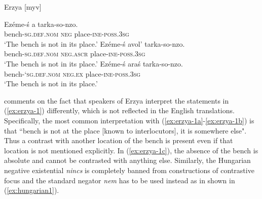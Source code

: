 \documentclass[output=paper,chinesefont,colorlinks,citecolor=brown]{langscibook}
\begin{document}
\begin{exe}
\ex Erzya [myv] \citep[91]{Hamari2007} \label{ex:erzya-1}
\begin{xlist}
\ex \label{ex:erzya-1a}
\gll Ezéme-ś a tarka-so-nzo.\\
bench-\textsc{sg.def.nom} \textsc{neg} place-\textsc{ine-poss.3sg}\\
\glt `The bench is not in its place.'
\ex \label{ex:erzya-1b}
\gll Ezéme-ś avol’ tarka-so-nzo.\\
bench-\textsc{sg.def.nom} \textsc{neg.ascr} place-\textsc{ine-poss.3sg}\\
\glt `The bench is not in its place.'
\ex \label{ex:erzya-1c}
\gll Ezéme-ś araś tarka-so-nzo.\\
bench-`\textsc{sg.def.nom} \textsc{neg.ex} place-\textsc{ine-poss.3sg}\\
\glt `The bench is not in its place.'
\end{xlist}
\end{exe}
\citet[177]{Hamari2007} comments on the fact that speakers of Erzya interpret the statements in (\ref{ex:erzya-1}) differently, which is not reflected in the English translations. Specifically, the most common interpretation with (\ref{ex:erzya-1a}-\ref{ex:erzya-1b}) is that “bench is not at the place [known to interlocutors], it is somewhere else". Thus a contrast with another location of the bench is present even if that location is not mentioned explicitly. In (\ref{ex:erzya-1c}), the absence of the bench is absolute and cannot be contrasted with anything else. Similarly, the Hungarian negative existential \textit{nincs} is completely banned from constructions of contrastive focus and the standard negator \textit{nem} has to be used instead as in shown in (\ref{ex:hungarian1}).
\end{document}
